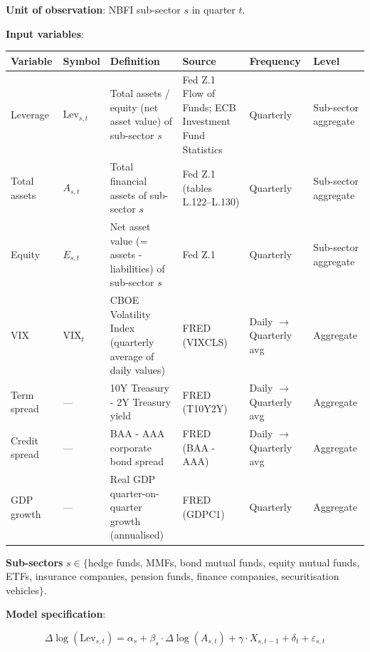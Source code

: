 \documentclass[11pt,a4paper]{article}
\begin{document}
\textbf{Unit of observation}: NBFI sub-sector $s$ in quarter $t$.

\textbf{Input variables}:


{\small
\begin{longtable}{|p{}|p{}|p{}|p{}|p{}|p{}|}
\hline
\textbf{Variable} & \textbf{Symbol} & \textbf{Definition} & \textbf{Source} & \textbf{Frequency} & \textbf{Level} \\
\hline
\endhead
Leverage & $\text{Lev}_{s,t}$ & Total assets / equity (net asset value) of sub-sector $s$ & Fed Z.1 Flow of Funds; ECB Investment Fund Statistics & Quarterly & Sub-sector aggregate \\
\hline
Total assets & $A_{s,t}$ & Total financial assets of sub-sector $s$ & Fed Z.1 (tables L.122--L.130) & Quarterly & Sub-sector aggregate \\
\hline
Equity & $E_{s,t}$ & Net asset value (= assets - liabilities) of sub-sector $s$ & Fed Z.1 & Quarterly & Sub-sector aggregate \\
\hline
VIX & $\text{VIX}_t$ & CBOE Volatility Index (quarterly average of daily values) & FRED (VIXCLS) & Daily $\rightarrow$ Quarterly avg & Aggregate \\
\hline
Term spread & --- & 10Y Treasury - 2Y Treasury yield & FRED (T10Y2Y) & Daily $\rightarrow$ Quarterly avg & Aggregate \\
\hline
Credit spread & --- & BAA - AAA corporate bond spread & FRED (BAA - AAA) & Daily $\rightarrow$ Quarterly avg & Aggregate \\
\hline
GDP growth & --- & Real GDP quarter-on-quarter growth (annualised) & FRED (GDPC1) & Quarterly & Aggregate \\
\hline
\end{longtable}
}

\textbf{Sub-sectors} $s \in \{$hedge funds, MMFs, bond mutual funds, equity mutual funds, ETFs, insurance companies, pension funds, finance companies, securitisation vehicles$\}$.

\textbf{Model specification}:

\[\Delta \log(\text{Lev}_{s,t}) = \alpha_s + \beta_s \cdot \Delta \log(A_{s,t}) + \gamma \cdot X_{s,t-1} + \delta_t + \varepsilon_{s,t}\]
\end{document}
